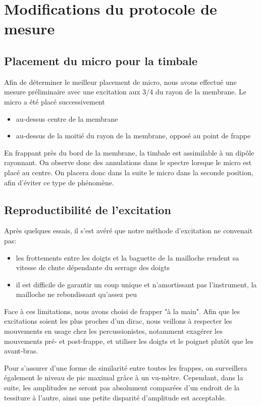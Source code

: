 \documentclass[atiam, article]{rapport} %
\begin{document}
\section{Modifications du protocole de mesure}

\subsection{Placement du micro pour la timbale}

Afin de déterminer le meilleur placement de micro, nous avons effectué une mesure préliminaire avec une excitation aux 3/4 du rayon de la membrane. Le micro a été placé successivement
\begin{itemize}
  \item au-dessus centre de la membrane
  \item au-dessus de la moitié du rayon de la membrane, opposé au point de frappe
\end{itemize}

En frappant près du bord de la membrane, la timbale est assimilable à un dipôle rayonnant. On observe donc des annulations dans le spectre lorsque le micro est placé au centre. On placera donc dans la suite le micro dans la seconde position, afin d'éviter ce type de phénomène.

\subsection{Reproductibilité de l'excitation}

Après quelques essais, il s'est avéré que notre méthode d'excitation ne convenait pas:
\begin{itemize}
  \item les frottements entre les doigts et la baguette de la mailloche rendent sa vitesse de chute dépendante du serrage des doigts
  \item il est difficile de garantir un coup unique et n'amortissant pas l'instrument, la mailloche ne rebondissant qu'assez peu
\end{itemize}

Face à ces limitations, nous avons choisi de frapper "à la main". Afin que les excitations soient les plus proches d'un dirac, nous veillons à respecter les mouvements en usage chez les percussionistes, notamment exagérer les mouvements pré- et post-frappe, et utiliser les doigts et le poignet plutôt que les avant-bras.

Pour s'assurer d'une forme de similarité entre toutes les frappes, on surveillera également le niveau de pic maximal grâce à un vu-mètre. Cependant, dans la suite, les amplitudes ne seront pas absolument comparées d'un endroit de la tessiture à l'autre, ainsi une petite disparité d'amplitude est acceptable.
\end{document}
